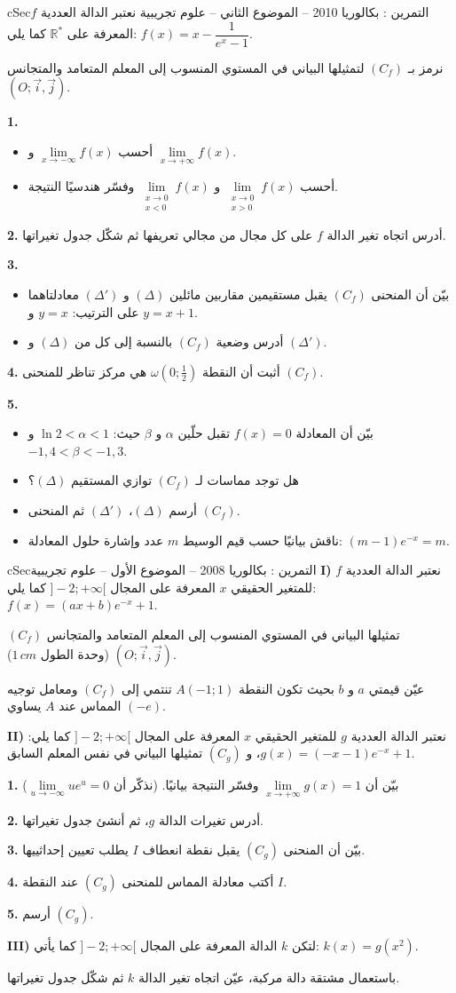 \documentclass[12pt,a4paper]{article}
\newenvironment{BOX}[2]{\begin{otherlanguage}{english}\begin{arbox}{#1}{#2}}{\end{arbox}\end{otherlanguage}}
\newcounter{exo}
\newenvironment{tamrin}[1]{\stepcounter{exo}\begin{BOX}{cSec}{التمرين \theexo: #1}}{\end{BOX}}
\newcommand{\R}{\mathbb{R}}
\newenvironment{sq}{\begin{itemize}[leftmargin=2.4em,itemsep=3pt]}{\end{itemize}}
\newcommand{\qa}{\item[(أ)]}\newcommand{\qb}{\item[(ب)]}\newcommand{\qc}{\item[(جـ)]}\newcommand{\qd}{\item[(د)]}\newcommand{\qe}{\item[(هـ)]}
\newcommand{\QQ}[1]{\par\smallskip\textbf{#1.} }
\begin{document}
\begin{tamrin}{بكالوريا 2010 -- الموضوع الثاني -- علوم تجريبية}
نعتبر الدالة العددية $f$ المعرفة على $\R^*$ كما يلي: $f(x)=x-\dfrac{1}{e^x-1}$.

نرمز بـ $(C_f)$ لتمثيلها البياني في المستوي المنسوب إلى المعلم المتعامد والمتجانس $(O;\vec i,\vec j)$.

\QQ{1}
\begin{sq}
\qa أحسب $\lim\limits_{x\to-\infty}f(x)$ و $\lim\limits_{x\to+\infty}f(x)$.
\qb أحسب $\lim\limits_{\substack{x\to0\\x>0}}f(x)$ و $\lim\limits_{\substack{x\to0\\x<0}}f(x)$ وفسّر هندسيًا النتيجة.
\end{sq}
\QQ{2} أدرس اتجاه تغير الدالة $f$ على كل مجال من مجالي تعريفها ثم شكّل جدول تغيراتها.
\QQ{3}
\begin{sq}
\qa بيّن أن المنحنى $(C_f)$ يقبل مستقيمين مقاربين مائلين $(\Delta)$ و $(\Delta')$ معادلتاهما على الترتيب: $y=x$ و $y=x+1$.
\qb أدرس وضعية $(C_f)$ بالنسبة إلى كل من $(\Delta)$ و $(\Delta')$.
\end{sq}
\QQ{4} أثبت أن النقطة $\omega\left(0;\frac12\right)$ هي مركز تناظر للمنحنى $(C_f)$.
\QQ{5}
\begin{sq}
\qa بيّن أن المعادلة $f(x)=0$ تقبل حلّين $\alpha$ و $\beta$ حيث: $\ln2<\alpha<1$ و $-1{,}4<\beta<-1{,}3$.
\qb هل توجد مماسات لـ $(C_f)$ توازي المستقيم $(\Delta)$؟
\qc أرسم $(\Delta)$، $(\Delta')$ ثم المنحنى $(C_f)$.
\qd ناقش بيانيًا حسب قيم الوسيط $m$ عدد وإشارة حلول المعادلة: $(m-1)e^{-x}=m$.
\end{sq}
\end{tamrin}

\begin{tamrin}{بكالوريا 2008 -- الموضوع الأول -- علوم تجريبية}
\textbf{I)} نعتبر الدالة العددية $f$ للمتغير الحقيقي $x$ المعرفة على المجال $]-2;+\infty[$ كما يلي: $f(x)=(ax+b)e^{-x}+1$.

$(C_f)$ تمثيلها البياني في المستوي المنسوب إلى المعلم المتعامد والمتجانس $(O;\vec i,\vec j)$ (وحدة الطول $1\,cm$).

عيّن قيمتي $a$ و $b$ بحيث تكون النقطة $A(-1;1)$ تنتمي إلى $(C_f)$ ومعامل توجيه المماس عند $A$ يساوي $(-e)$.

\textbf{II)} نعتبر الدالة العددية $g$ للمتغير الحقيقي $x$ المعرفة على المجال $]-2;+\infty[$ كما يلي: $g(x)=(-x-1)e^{-x}+1$، و $(C_g)$ تمثيلها البياني في نفس المعلم السابق.

\QQ{1} بيّن أن $\lim\limits_{x\to+\infty}g(x)=1$ وفسّر النتيجة بيانيًا. (نذكّر أن $\lim\limits_{u\to-\infty}ue^u=0$)
\QQ{2} أدرس تغيرات الدالة $g$، ثم أنشئ جدول تغيراتها.
\QQ{3} بيّن أن المنحنى $(C_g)$ يقبل نقطة انعطاف $I$ يطلب تعيين إحداثييها.
\QQ{4} أكتب معادلة المماس للمنحنى $(C_g)$ عند النقطة $I$.
\QQ{5} أرسم $(C_g)$.

\textbf{III)} لتكن $k$ الدالة المعرفة على المجال $]-2;+\infty[$ كما يأتي: $k(x)=g(x^2)$.

باستعمال مشتقة دالة مركبة، عيّن اتجاه تغير الدالة $k$ ثم شكّل جدول تغيراتها.
\end{tamrin}
\end{document}
